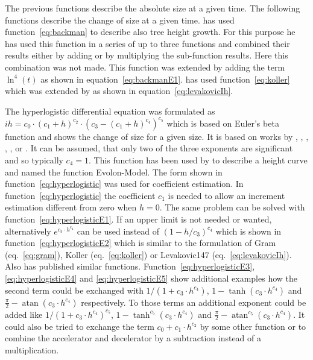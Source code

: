 \documentclass[a4paper,twocolumn]{article}
\DeclareMathOperator{\atan}{atan}
\begin{document}
The previous functions describe the absolute size at a given time. The
following functions describe the change of size at a given time.
\cite{backmann1931DasWachstumsproblem} has used
function~\ref{eq:backman} to describe also tree height growth. For
this purpose he has used this function in a series of up to three
functions and combined their results either by adding or by
multiplying the sub-function results. Here this combination was not
made. This function was extended by adding the term $\ln^4(t)$ as
shown in equation~\ref{eq:backmanE1}. \cite{koller1886Zuwachskurven}
has used function~\ref{eq:koller} which was extended by
\cite{Levakovic1935Bestandeshoehenkurve} as shown in
equation~\ref{eq:levakovicIh}.

The hyperlogistic differential equation was formulated as
$ih = c_0 \cdot (c_1 + h)^{c_2} \cdot (c_3-(c_1 + h)^{c_4})^{c_5}$
which is based on Euler's beta function and shows the change of size
for a given size. It is based on works by
\cite{pearson1934tables},
\cite{richards1959GrowthCurve},
\cite{nelder1961GeneralizedLogisticCurv},
\cite{blumberg1968LogisticGrowthRateFunctions},
\cite{turner1969AGeneralizationOfTheLogisticLawOfGrowth},
\cite{turner1976ATheoryOfGrowth} or
\cite{buis1991LogisticGrowth}.
It can be assumed, that only
two of the three exponents are significant and so typically
$c_4=1$. This function has been used by \cite{mendeAlbrecht2001} to
describe a height curve and named the function Evolon-Model. The form
shown in function~\ref{eq:hyperlogistic} was used for coefficient
estimation.
In function~\ref{eq:hyperlogistic} the coefficient $c_1$ is needed to
allow an increment estimation different from zero when $h=0$. The same
problem can be solved with function~\ref{eq:hyperlogisticE1}. If an
upper limit is not needed or wanted, alternatively
$e^{c_3 \cdot  h^{c_4}}$ can be used instead of $(1-h/c_3)^{c_4}$
which is shown in function~\ref{eq:hyperlogisticE2} which is similar
to the formulation of Gram (eq.~\ref{eq:gram}), Koller
(eq.~\ref{eq:koller}) or Levakovic147 (eq.~\ref{eq:levakovicIh}). Also
\cite{zeide1993AnalysisOfGrowthEquations} has published similar functions.
Function~\ref{eq:hyperlogisticE3}, \ref{eq:hyperlogisticE4} and
\ref{eq:hyperlogisticE5}
show additional examples how the second term
could be exchanged with $1/(1 + c_3\cdot h^{c_4})$,
$1 - \tanh(c_3 \cdot h^{c_4})$ and
$\frac{\pi}{2} - \atan(c_3\cdot h^{c_4})$ respectively.
To those terms an additional exponent could be added like
$1/(1 + c_3\cdot h^{c_4})^{c_5}$,
$1 - \tanh^{c_5}(c_3 \cdot h^{c_4})$ and
$\frac{\pi}{2} - \atan^{c_5}(c_3\cdot h^{c_4})$. It could also be
tried to exchange the term $c_0 + c_1 \cdot h^{c_2}$ by some other
function or to combine the accelerator and decelerator by a
subtraction instead of a multiplication.
\end{document}
